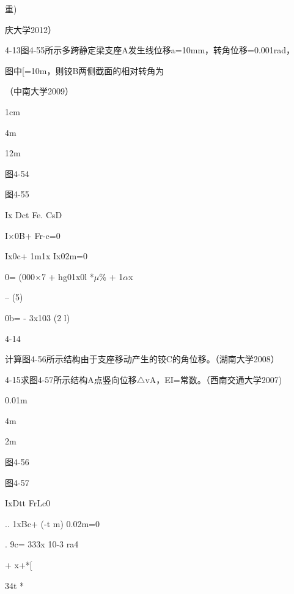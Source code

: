 重)

庆大学2012）

4-13图4-55所示多跨静定梁支座A发生线位移a=10mm，转角位移=0.001rad，

图中[=10m，则铰B两侧截面的相对转角为

（中南大学2009）

1cm

4m

12m

图4-54

图4-55

Ix Dct Fe. CsD

I$\times$0B+ Fr-c=0

Ix0c+ 1m1x Ix02m=0

0= (000$\times$7 + hg01x0l *$\mu$\% + 1$\alpha$x

-- (5)

0b= - 3x103 (2 l)

4-14

计算图4-56所示结构由于支座移动产生的铰C的角位移。（湖南大学2008）

4-15求图4-57所示结构A点竖向位移$\triangle$vA，EI=常数。（西南交通大学2007)

0.01m

4m

2m

图4-56

图4-57

IxDtt FrLc0

.. 1xBc+ (-t m) 0.02m=0

. 9c= 333x 10-3 ra4

+ x+*[

34t *

